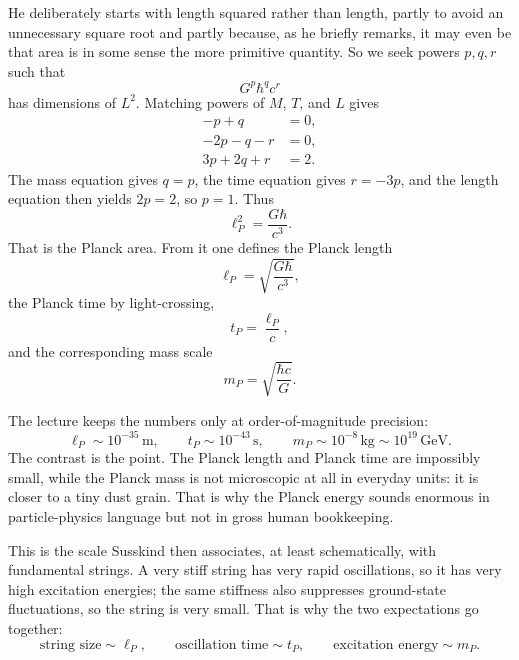 He deliberately starts with length squared rather than length, partly to avoid an unnecessary square root and partly because, as he briefly remarks, it may even be that area is in some sense the more primitive quantity. So we seek powers \(p,q,r\) such that
\begin{equation}
G^{p}\hbar^{q}c^{r}
\end{equation}
has dimensions of \(L^{2}\). Matching powers of \(M\), \(T\), and \(L\) gives
\begin{align}
-p+q&=0,\\
-2p-q-r&=0,\\
3p+2q+r&=2.
\end{align}
The mass equation gives \(q=p\), the time equation gives \(r=-3p\), and the length equation then yields \(2p=2\), so \(p=1\). Thus
\begin{equation}
\ell_{P}^{2}=\frac{G\hbar}{c^{3}}.
\end{equation}
That is the Planck area. From it one defines the Planck length
\begin{equation}
\ell_{P}=\sqrt{\frac{G\hbar}{c^{3}}},
\end{equation}
the Planck time by light-crossing,
\begin{equation}
t_{P}=\frac{\ell_{P}}{c},
\end{equation}
and the corresponding mass scale
\begin{equation}
m_{P}=\sqrt{\frac{\hbar c}{G}}.
\end{equation}

The lecture keeps the numbers only at order-of-magnitude precision:
\begin{equation}
\ell_{P}\sim 10^{-35}\,\mathrm{m},
\qquad
t_{P}\sim 10^{-43}\,\mathrm{s},
\qquad
m_{P}\sim 10^{-8}\,\mathrm{kg}\sim 10^{19}\,\mathrm{GeV}.
\end{equation}
The contrast is the point. The Planck length and Planck time are impossibly small, while the Planck mass is not microscopic at all in everyday units: it is closer to a tiny dust grain. That is why the Planck energy sounds enormous in particle-physics language but not in gross human bookkeeping.

This is the scale Susskind then associates, at least schematically, with fundamental strings. A very stiff string has very rapid oscillations, so it has very high excitation energies; the same stiffness also suppresses ground-state fluctuations, so the string is very small. That is why the two expectations go together:
\begin{equation}
\text{string size} \sim \ell_{P},
\qquad
\text{oscillation time} \sim t_{P},
\qquad
\text{excitation energy} \sim m_{P}.
\end{equation}

